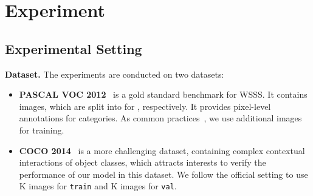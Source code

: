\documentclass[10pt,twocolumn,letterpaper]{article}
\def\coco{COCO 2014}
\begin{document}
	



\section{Experiment}

\subsection{Experimental Setting}\label{sec:settings}

\noindent\textbf{Dataset.} The experiments are conducted on two datasets:\!\!
\begin{itemize}[leftmargin=*]
	\setlength{\itemsep}{0pt}
	\setlength{\parsep}{-2pt}
	\setlength{\parskip}{-0pt}
	\setlength{\leftmargin}{-10pt}
\vspace{-6pt}\item \textbf{PASCAL VOC 2012}~\cite{everingham2010pascal} is a gold standard benchmark for WSSS. It contains  images, which are split into  for , respectively. It provides pixel-level annotations for   categories. As common practices~\cite{huang2018weakly,lee2019ficklenet,zhang2020causal}, we use additional  images~\cite{hariharan2011semantic} for training.
	
	\item \textbf{\coco}~\cite{lin2014microsoft}  is a more challenging dataset, containing complex contextual interactions of  object classes, which attracts interests to verify the performance of our model in this dataset. We follow the official setting to use K images for \texttt{train} and K images for \texttt{val}. 
	\vspace{-4pt}
\end{itemize}



\newcommand{\demph}[1]{\textcolor{Gray}{#1}}
  \renewcommand{\hl}[1]{\textcolor{Highlight}{#1}}
  \newcommand{\reshl}[2]{
	\textbf{#1} \fontsize{7.5pt}{1em}\selectfont\color{mygreen}{ \textbf{#2}}
}
\end{document}
